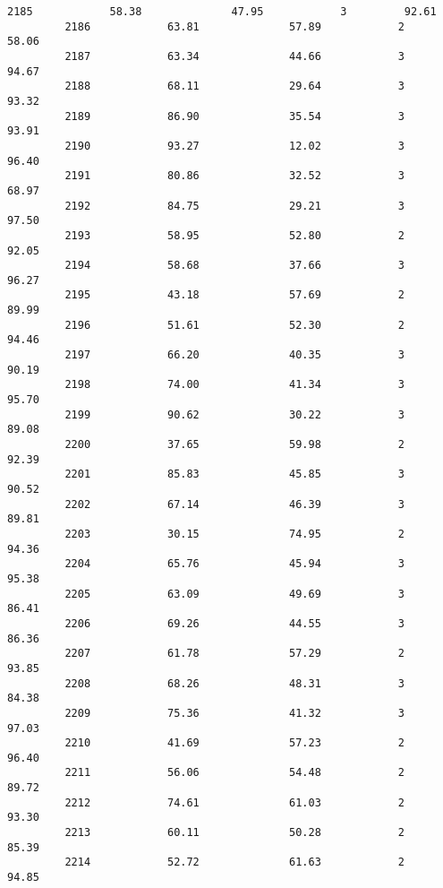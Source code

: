 \documentclass[11pt]{llncs}
\begin{document}
\begin{Verbatim}[commandchars=\\\{\}]
         2185            58.38              47.95            3         92.61   
         2186            63.81              57.89            2         58.06   
         2187            63.34              44.66            3         94.67   
         2188            68.11              29.64            3         93.32   
         2189            86.90              35.54            3         93.91   
         2190            93.27              12.02            3         96.40   
         2191            80.86              32.52            3         68.97   
         2192            84.75              29.21            3         97.50   
         2193            58.95              52.80            2         92.05   
         2194            58.68              37.66            3         96.27   
         2195            43.18              57.69            2         89.99   
         2196            51.61              52.30            2         94.46   
         2197            66.20              40.35            3         90.19   
         2198            74.00              41.34            3         95.70   
         2199            90.62              30.22            3         89.08   
         2200            37.65              59.98            2         92.39   
         2201            85.83              45.85            3         90.52   
         2202            67.14              46.39            3         89.81   
         2203            30.15              74.95            2         94.36   
         2204            65.76              45.94            3         95.38   
         2205            63.09              49.69            3         86.41   
         2206            69.26              44.55            3         86.36   
         2207            61.78              57.29            2         93.85   
         2208            68.26              48.31            3         84.38   
         2209            75.36              41.32            3         97.03   
         2210            41.69              57.23            2         96.40   
         2211            56.06              54.48            2         89.72   
         2212            74.61              61.03            2         93.30   
         2213            60.11              50.28            2         85.39   
         2214            52.72              61.63            2         94.85   
         

\end{Verbatim}
\end{document}
